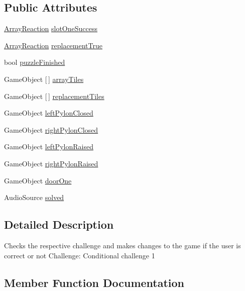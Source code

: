 \subsection*{Public Attributes}
\begin{DoxyCompactItemize}
\item 
\hyperlink{class_array_reaction}{Array\+Reaction} \hyperlink{class_logical_and_completion_a7ed4ecdaf29b98fa3264c51a64eb726e}{slot\+One\+Success}
\item 
\hyperlink{class_array_reaction}{Array\+Reaction} \hyperlink{class_logical_and_completion_a925f99929d6fe0f68f245914fb0e1e95}{replacement\+True}
\item 
bool \hyperlink{class_logical_and_completion_a5bff7c897b4ebfca7d56e238917de8e4}{puzzle\+Finished}
\item 
Game\+Object \mbox{[}$\,$\mbox{]} \hyperlink{class_logical_and_completion_a1d6d43ba546c81e5b9c5cda3837be009}{array\+Tiles}
\item 
Game\+Object \mbox{[}$\,$\mbox{]} \hyperlink{class_logical_and_completion_a9dd15007bbc76569e7c82904c2464124}{replacement\+Tiles}
\item 
Game\+Object \hyperlink{class_logical_and_completion_af6e487086d828fe81dc8890754f32c38}{left\+Pylon\+Closed}
\item 
Game\+Object \hyperlink{class_logical_and_completion_ad50f71a4157df3e8ca40c98eada1d3fb}{right\+Pylon\+Closed}
\item 
Game\+Object \hyperlink{class_logical_and_completion_a803aec34894a6af536b64611019c6372}{left\+Pylon\+Raised}
\item 
Game\+Object \hyperlink{class_logical_and_completion_a49166cfb32e7409ba04133c408d47793}{right\+Pylon\+Raised}
\item 
Game\+Object \hyperlink{class_logical_and_completion_a95b8a1803a7ce81d2d45f88b036e7f9e}{door\+One}
\item 
Audio\+Source \hyperlink{class_logical_and_completion_a2cf6ce1f33f9c648fa21cb6b97e785b3}{solved}
\end{DoxyCompactItemize}


\subsection{Detailed Description}
Checks the respective challenge and makes changes to the game if the user is correct or not Challenge\+: Conditional challenge 1 

\subsection{Member Function Documentation}
\mbox{\label{class_logical_and_completion_a6474fb7522f26a6cc7a0a5ce3965fffd}} 
